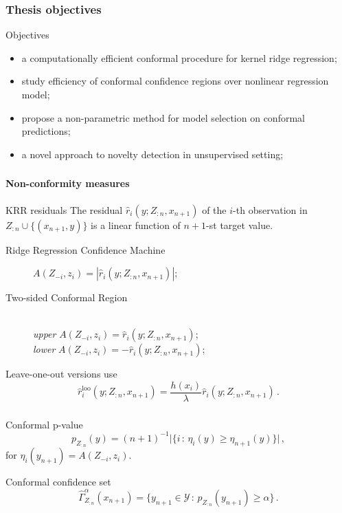 \documentclass[t]{beamer}  %
\newcommand{\Ycal}{\mathcal{Y}}
\begin{document}
\begin{frame}[t]\frametitle{Thesis objectives}
  \begin{block}{Objectives}
    \begin{itemize}
      \item a computationally efficient conformal procedure for kernel ridge regression;
      \item study efficiency of conformal confidence regions over nonlinear regression model;
      \item propose a non-parametric method for model selection on conformal predictions;
      \item a novel approach to novelty detection in unsupervised setting;
    \end{itemize}
  \end{block}
\end{frame}

\begin{frame}[t]\frametitle{\insertsection}
  \framesubtitle{Non-conformity measures}
  \begin{block}{KRR residuals}  
    The residual $\hat{r}_i(y; Z_{:n}, x_{n+1})$ of the $i$-th observation in
    $Z_{:n}\cup\{(x_{n+1}, y)\}$ is a linear function of $n+1$-st target value.
  \end{block}

  \begin{description}
    \item[Ridge Regression Confidence Machine] $A(Z_{-i}, z_i) = |\hat{r}_i(y; Z_{:n}, x_{n+1})|$;
    \vspace{\baselineskip}
    \item[Two-sided Conformal Region] \hfill\\
      \textit{upper} $A(Z_{-i}, z_i) = \hat{r}_i(y; Z_{:n}, x_{n+1})$;\hfill\\
      \textit{lower} $A(Z_{-i}, z_i) = -\hat{r}_i(y; Z_{:n}, x_{n+1})$;
  \end{description}

  \begin{block}{Leave-one-out versions use}
    $$ \hat{r}^{\text{loo}}_i(y; Z_{:n}, x_{n+1})
      = \frac{h(x_i)}{\lambda} \hat{r}_i(y; Z_{:n}, x_{n+1}) \,. $$
  \end{block}
\end{frame}

\begin{frame}[c]\frametitle{\insertsection}
  \begin{block}{Conformal p-value}
    $$ p_{Z_{:n}}(y)
          = (n+1)^{-1} \bigl\lvert\{ i \,:\, \eta_i(y) \geq \eta_{n+1}(y) \}\bigr\rvert
      \,, $$
    for $\eta_i(y_{n+1}) = A(Z_{-i}, z_i)$.
  \end{block}
  \vspace{\baselineskip}
  \vspace{\baselineskip}
  \begin{block}{Conformal confidence set}
    $$ \hat{\Gamma}_{Z_{:n}}^\alpha(x_{n+1})
        = \bigl\{ y_{n+1}\in \Ycal \,:\, p_{Z_{:n}}(y_{n+1}) \geq \alpha \bigr\}
      \,. $$
  \end{block}
\end{frame}
\end{document}
